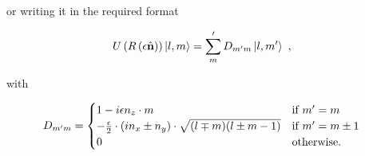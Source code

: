 or writing it in the required format

\begin{align}
    \Rotation{\epsilon}{\normalvector} \ket{l, m} &= \sum_m' D_{m'm} \ket{l, m'}~,
\end{align}

with

\begin{align}
    D_{m'm} &= 
    \begin{cases}
        1 - \iota\epsilon n_z \cdot m & \textnormal{if } m' = m \\
        -\frac{\epsilon}{2} \cdot (\iota n_x \pm n_y) \cdot \sqrt{(l \mp m)(l \pm m-1)}
                & \textnormal{if } m' = m \pm 1 \\
        0 & \textnormal{otherwise.}
    \end{cases}
\end{align}